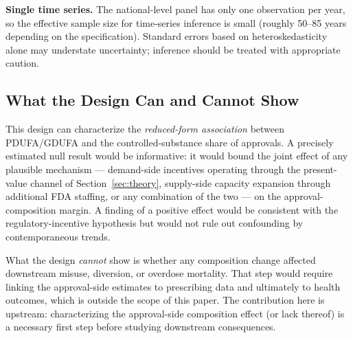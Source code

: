 \textbf{Single time series.} The national-level panel has only one observation per year, so the effective sample size for time-series inference is small (roughly 50--85 years depending on the specification). Standard errors based on heteroskedasticity alone may understate uncertainty; inference should be treated with appropriate caution.

\subsection{What the Design Can and Cannot Show}

This design can characterize the \textit{reduced-form association} between PDUFA/GDUFA and the controlled-substance share of approvals. A precisely estimated null result would be informative: it would bound the joint effect of any plausible mechanism --- demand-side incentives operating through the present-value channel of Section~\ref{sec:theory}, supply-side capacity expansion through additional FDA staffing, or any combination of the two --- on the approval-composition margin. A finding of a positive effect would be consistent with the regulatory-incentive hypothesis but would not rule out confounding by contemporaneous trends.

What the design \textit{cannot} show is whether any composition change affected downstream misuse, diversion, or overdose mortality. That step would require linking the approval-side estimates to prescribing data and ultimately to health outcomes, which is outside the scope of this paper. The contribution here is upstream: characterizing the approval-side composition effect (or lack thereof) is a necessary first step before studying downstream consequences.
